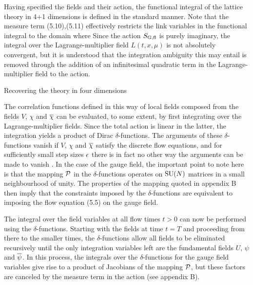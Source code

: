 Having specified the fields and their action,
the functional integral of the lattice theory in 4+1 dimensions
is defined in the standard manner. 
Note that the measure term (5.10),(5.11) 
effectively restricts the link variables 
in the functional integral to the domain where
Since the action $S_{\rm G,fl}$ is purely imaginary, 
the integral over the Lagrange-multiplier field $L(t,x,\mu)$ 
is not absolutely convergent, but it is understood
that the integration ambiguity this may entail is removed 
through the addition of an
infinitesimal quadratic term in the Lagrange-multiplier field
to the action.


 Recovering the theory in four dimensions

The correlation functions defined in this way of local fields 
composed from the fields $V$, $\chi$ and $\overline{\chi}$
can be evaluated, to some extent,
by first integrating over the Lagrange-multiplier fields.
Since the total action is linear in the latter, 
the integration yields a product
of Dirac $\delta$-functions.
The arguments of these 
$\delta$-functions vanish if $V$, $\chi$ and $\overline{\chi}$ satisfy the discrete
flow equations, and for sufficiently small step sizes $\epsilon$
there is in fact no other way the arguments 
can be made to vanish%
\kern1pt.
In the case of the gauge field,
the important point to note here is
that the mapping ${\cal P}$ in the $\delta$-functions 
operates on ${\rm SU}(N)$ matrices in a small neighbourhood of unity.
The properties of the mapping quoted in appendix B then
imply that the constraints imposed by the $\delta$-functions 
are equivalent to imposing the flow equation (5.5) on the gauge field.

The integral over the field variables at all flow times $t>0$ 
can now be performed using the $\delta$-functions. Starting
with the fields at time $t=T$ and proceeding from there 
to the smaller times, the $\delta$-functions allow 
all fields to be eliminated recursively until the only
integration variables left are the fundamental fields $U$, 
$\psi$ and $\overline{\psi}$. In this process, the integrals over the 
$\delta$-functions for the gauge field variables give rise
to a product of Jacobians of the mapping ${\cal P}$, but 
these factors are canceled by the measure term in the action
(see appendix B).

